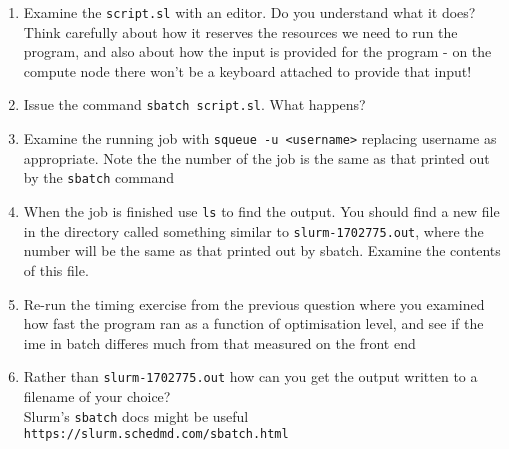 \documentclass[a4paper, 12pt]{article}
\def \cc   {\tt }               %
\begin{document}
\begin{enumerate}
  
  \item Examine the {\cc script.sl} with an editor. Do you understand what it does? Think carefully about how it reserves the
     resources we need to run the program, and also about how the input is provided for the program - on the compute node there won't be a keyboard attached to provide that input!
  
  \item Issue the command {\cc sbatch script.sl}. What happens?

  \item Examine the running job with {\cc squeue -u <username>} replacing username as appropriate. Note the the number of the job is the same as that printed out by the {\cc sbatch} command

  \item When the job is finished use {\cc ls} to find the output. You should find a new file in the directory called something
     similar to {\cc slurm-1702775.out}, where the number will be the same as that printed out by sbatch. Examine the contents of this file.

  \item Re-run the timing exercise from the previous question where you examined how fast the program ran
     as a function of optimisation level, and see if the ime in batch differes much from that measured on the front end

  \item Rather than {\cc slurm-1702775.out} how can you get the output written to a filename of your choice? \\
  Slurm's {\cc sbatch} docs might be useful {\cc https://slurm.schedmd.com/sbatch.html}

\end{enumerate}

\end{document}
